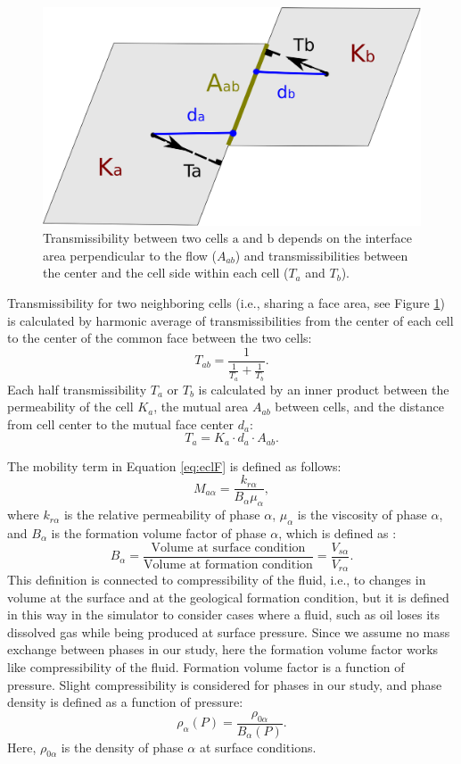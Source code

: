 \begin{figure}
 \centering{}
 \includegraphics[width=0.4\linewidth]{./figurer/trans}
 \caption{Transmissibility between two cells $\mbox{a}$ and $\mbox{b}$ depends on the interface area perpendicular to the flow ($A_{ab}$) and transmissibilities between the center and the cell side within each cell ($T_a$ and $T_b$).}
 \label{fig:tran}
\end{figure}

Transmissibility for two neighboring cells (i.e., sharing a face area, see
Figure \ref{fig:tran}) is
calculated by harmonic average of transmissibilities from the center of each
cell to the center of the common face between the two cells:
\begin{equation}
 T_{ab}=\frac{1}{\frac{1}{T_a}+\frac{1}{T_b}}.
 \label{eq:Thav}
\end{equation} Each half transmissibility $T_{a}$ or $T_{b}$ is calculated by an inner product
between the permeability of the cell $K_a $, the mutual area $A_{ab}$ between cells, and the distance from cell center to the mutual face center $d_a$:
\begin{equation}
  T_a = K_a \cdot d_a \cdot A_{ab}.
  \label{eq:tran}
\end{equation}


The mobility term in Equation \ref{eq:eclF} is defined as follows:
\begin{equation}
 M_{a\alpha}=\frac{k_{r\alpha}}{B_\alpha \mu_\alpha},
 \label{eq:mob}
\end{equation} where $k_{r\alpha}$ is the relative permeability of phase
$\alpha$, $\mu_\alpha$ is the viscosity of phase $\alpha$, and $B_\alpha$ is the
formation volume factor of phase $\alpha$, which is defined as :
\begin{equation}
 B_\alpha=\frac{\mbox{Volume at surface condition}}{\mbox{Volume at formation
condition}}=\frac{V_{s\alpha}}{V_{r\alpha}}.  
\end{equation} This definition is connected to compressibility
of the fluid, i.e., to changes in volume at the surface and at the geological formation condition, but it is defined in this way in the simulator to consider cases where a
fluid, such as oil loses its dissolved gas while being produced at surface pressure.
Since we assume no mass exchange between phases in our study, here the formation
volume factor works like compressibility of the fluid. Formation volume factor
is a function of pressure. Slight compressibility is considered for phases in our study, and phase density
is defined as a function of pressure:
\begin{equation}
 \rho_\alpha(P) =\frac{\rho_{0\alpha}}{B_\alpha(P)}.
 \label{eq:rho}
\end{equation} Here, $\rho_{0\alpha}$ is the density of phase $\alpha$ at
surface conditions.

